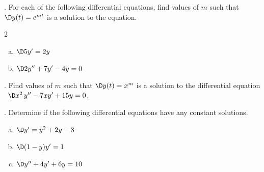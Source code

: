 \documentclass[12pt]{amsart}
\numberwithin{equation}{section}
\begin{document}
\newpage
\thispagestyle{empty}

. For each of the following differential equations, find values of $m$ such that $\D y(t)=e^{mt}$ is a solution to the equation. 
\begin{multicols}{2}
\begin{enumerate}[(a)]
\item  $\D 5y' = 2y$ \\

\item  $\D 2y''+7y'-4y=0$ \\
\end{enumerate}
\end{multicols}

\vfill

. Find values of $m$ such that $\D y(t)=x^{m}$ is a solution to the differential equation \, $\D x^2\,y''-7xy'+15y=0$. 

\vfill

\thispagestyle{empty}
\newpage
\thispagestyle{empty}

. Determine if the following differential equations have any constant solutions. 

\begin{enumerate}[(a)]

\item  $\D y'=y^2+2y-3$ \\

\vfill

\item  $\D (1-y)y'=1$ \\

\vfill

\item  $\D y''+4y'+6y=10$ \\

\vfill

\end{enumerate}


\thispagestyle{empty}
\newpage
\thispagestyle{empty}
\end{document}
